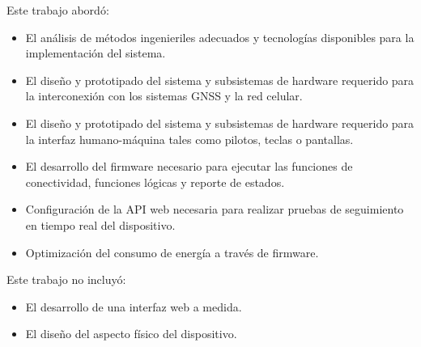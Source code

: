 Este trabajo abordó:
\begin{itemize}
    \item El análisis de métodos ingenieriles adecuados y tecnologías disponibles para la implementación del sistema.
    \item El diseño y prototipado del sistema y subsistemas de hardware requerido para la interconexión con los sistemas GNSS y la red celular. 
    \item El diseño y prototipado del sistema y subsistemas de hardware requerido para la interfaz humano-máquina tales como pilotos, teclas o pantallas. 
    \item El desarrollo del firmware necesario para ejecutar las funciones de conectividad, funciones lógicas y reporte de estados.
    \item Configuración de la API web necesaria para realizar pruebas de seguimiento en tiempo real del dispositivo. 
    \item Optimización del consumo de energía a través de firmware.
\end{itemize}

Este trabajo no incluyó:

\begin{itemize}
    \item El desarrollo de una interfaz web a medida.
    \item El diseño del aspecto físico del dispositivo. 
\end{itemize}



